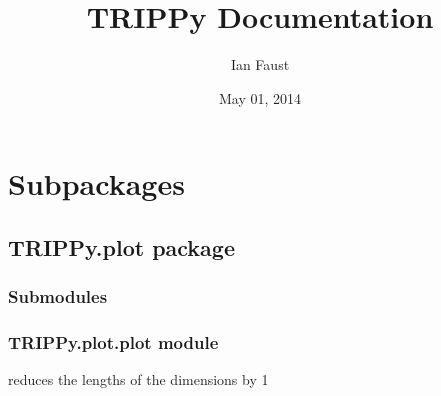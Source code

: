 \documentclass[letterpaper,10pt,english]{sphinxmanual}
\title{TRIPPy Documentation}
\date{May 01, 2014}
\author{Ian Faust}
\begin{document}
\maketitle
\tableofcontents
{}\label{TRIPPy::doc}



\chapter{Subpackages}
\label{TRIPPy:trippy-package}\label{TRIPPy:subpackages}

\section{TRIPPy.plot package}
\label{TRIPPy.plot:trippy-plot-package}\label{TRIPPy.plot::doc}

\subsection{Submodules}
\label{TRIPPy.plot:submodules}

\subsection{TRIPPy.plot.plot module}
\label{TRIPPy.plot:module-TRIPPy.plot.plot}\label{TRIPPy.plot:trippy-plot-plot-module}

\begin{fulllineitems}
\label{TRIPPy.plot:TRIPPy.plot.plot.genCartGrid}
\end{fulllineitems}


\begin{fulllineitems}
\label{TRIPPy.plot:TRIPPy.plot.plot.genCylGrid}
\end{fulllineitems}


\begin{fulllineitems}
\label{TRIPPy.plot:TRIPPy.plot.plot.genVertsFromPixel}
reduces the lengths of the dimensions by 1

\end{fulllineitems}
\end{document}

